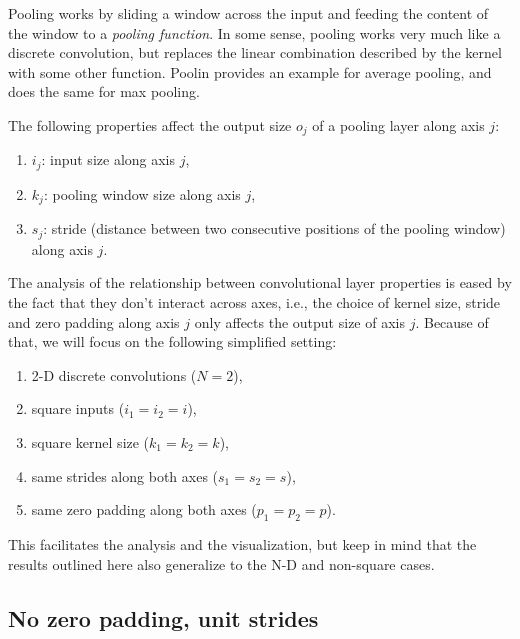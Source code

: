 \documentclass[%
oneside,                 %
final,                   %
10pt]{article}
\begin{document}
Pooling works by sliding a window across the input and feeding the content of
the window to a {\em pooling function}. In some sense, pooling works very much
like a discrete convolution, but replaces the linear combination described by
the kernel with some other function. Poolin
provides an example for average pooling, and 
does the same for max pooling.

The following properties affect the output size $o_j$ of a pooling layer
along axis $j$:

\begin{enumerate}
\item $i_j$: input size along axis $j$,

\item $k_j$: pooling window size along axis $j$,

\item $s_j$: stride (distance between two consecutive positions of the pooling window) along axis $j$.
\end{enumerate}

\noindent
The analysis of the relationship between convolutional layer properties is eased
by the fact that they don't interact across axes, i.e., the choice of kernel
size, stride and zero padding along axis $j$ only affects the output size of
axis $j$. Because of that, we will focus on the following simplified
setting:

\begin{enumerate}
\item 2-D discrete convolutions ($N = 2$),

\item square inputs ($i_1 = i_2 = i$),

\item square kernel size ($k_1 = k_2 = k$),

\item same strides along both axes ($s_1 = s_2 = s$),

\item same zero padding along both axes ($p_1 = p_2 = p$).
\end{enumerate}

\noindent
This facilitates the analysis and the visualization, but keep in mind that the
results outlined here also generalize to the N-D and non-square cases.

\subsection*{No zero padding, unit strides}
\end{document}
